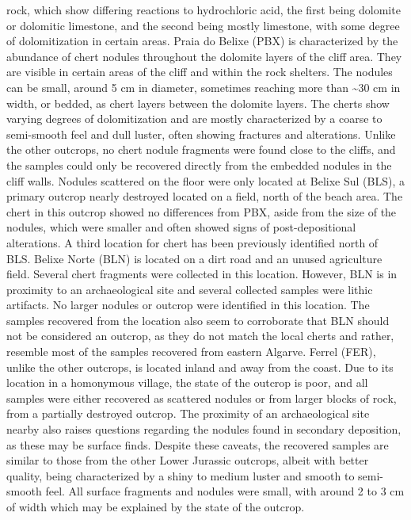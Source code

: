 \documentclass[
  a4paper,
  DIV=11,
  numbers=noendperiod]{scrreprt}
\begin{document}
rock, which show differing reactions to hydrochloric acid, the first
being dolomite or dolomitic limestone, and the second being mostly
limestone, with some degree of dolomitization in certain areas. Praia do
Belixe (PBX) is characterized by the abundance of chert nodules
throughout the dolomite layers of the cliff area. They are visible in
certain areas of the cliff and within the rock shelters. The nodules can
be small, around 5 cm in diameter, sometimes reaching more than
\textasciitilde30 cm in width, or bedded, as chert layers between the
dolomite layers. The cherts show varying degrees of dolomitization and
are mostly characterized by a coarse to semi-smooth feel and dull
luster, often showing fractures and alterations. Unlike the other
outcrops, no chert nodule fragments were found close to the cliffs, and
the samples could only be recovered directly from the embedded nodules
in the cliff walls. Nodules scattered on the floor were only located at
Belixe Sul (BLS), a primary outcrop nearly destroyed located on a field,
north of the beach area. The chert in this outcrop showed no differences
from PBX, aside from the size of the nodules, which were smaller and
often showed signs of post-depositional alterations. A third location
for chert has been previously identified north of BLS. Belixe Norte
(BLN) is located on a dirt road and an unused agriculture field. Several
chert fragments were collected in this location. However, BLN is in
proximity to an archaeological site and several collected samples were
lithic artifacts. No larger nodules or outcrop were identified in this
location. The samples recovered from the location also seem to
corroborate that BLN should not be considered an outcrop, as they do not
match the local cherts and rather, resemble most of the samples
recovered from eastern Algarve. Ferrel (FER), unlike the other outcrops,
is located inland and away from the coast. Due to its location in a
homonymous village, the state of the outcrop is poor, and all samples
were either recovered as scattered nodules or from larger blocks of
rock, from a partially destroyed outcrop. The proximity of an
archaeological site nearby also raises questions regarding the nodules
found in secondary deposition, as these may be surface finds. Despite
these caveats, the recovered samples are similar to those from the other
Lower Jurassic outcrops, albeit with better quality, being characterized
by a shiny to medium luster and smooth to semi-smooth feel. All surface
fragments and nodules were small, with around 2 to 3 cm of width which
may be explained by the state of the outcrop.
\end{document}
